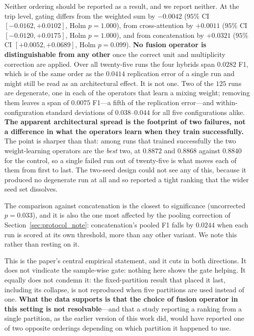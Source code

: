 \documentclass[journal]{IEEEtran}
\begin{document}
Neither ordering should be reported as a result, and we report neither. At the trip level, gating differs from the weighted sum by $-0.0042$ ($95\%$ CI $[-0.0162, +0.0102]$, Holm $p = 1.000$), from cross-attention by $+0.0011$ ($95\%$ CI $[-0.0120, +0.0175]$, Holm $p = 1.000$), and from concatenation by $+0.0321$ ($95\%$ CI $[+0.0052, +0.0689]$, Holm $p = 0.099$). \textbf{No fusion operator is distinguishable from any other} once the correct unit and multiplicity correction are applied. Over all twenty-five runs the four hybrids span $0.0282$ F1, which is of the same order as the $0.0414$ replication error of a single run and might still be read as an architectural effect. It is not one. Two of the $125$ runs are degenerate, one in each of the operators that learn a mixing weight; removing them leaves a span of $\bm{0.0075}$ F1---a fifth of the replication error---and within-configuration standard deviations of $0.038$--$0.044$ for all five configurations alike. \textbf{The apparent architectural spread is the footprint of two failures, not a difference in what the operators learn when they train successfully.} The point is sharper than that: among runs that trained successfully the two weight-learning operators are the \emph{best} two, at $0.8872$ and $0.8868$ against $0.8840$ for the control, so a single failed run out of twenty-five is what moves each of them from first to last. The two-seed design could not see any of this, because it produced no degenerate run at all and so reported a tight ranking that the wider seed set dissolves.

The comparison against concatenation is the closest to significance (uncorrected $p = 0.033$), and it is also the one most affected by the pooling correction of Section~\ref{sec:protocol_note}: concatenation's pooled F1 falls by $0.0244$ when each run is scored at its own threshold, more than any other variant. We note this rather than resting on it.

This is the paper's central empirical statement, and it cuts in both directions. It does not vindicate the sample-wise gate: nothing here shows the gate helping. It equally does not condemn it: the fixed-partition result that placed it last, including its collapse, is not reproduced when five partitions are used instead of one. \textbf{What the data supports is that the choice of fusion operator in this setting is not resolvable}---and that a study reporting a ranking from a single partition, as the earlier version of this work did, would have reported one of two opposite orderings depending on which partition it happened to use.
\end{document}
